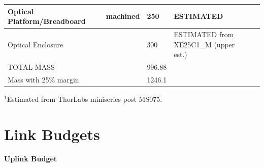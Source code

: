 \documentclass[12pt]{article}
\begin{document}
\begin{landscape}
\begin{center}
\begin{longtable}{| p{3.25cm} | p{2.2cm} | p{3cm} | p{1.75cm} | p{2.5cm} | p{1.55cm} | p{5cm} |}
    Optical Platform/Breadboard &       & machined & 250   & ESTIMATED &       &  \\ \hline
    Optical Enclosure &       &       & 300   & ESTIMATED from XE25C1\_M (upper est.) &       &  \\ \hline
    TOTAL MASS &       &       & 996.88 &       &       &  \\
    Mass with 25\% margin &       &       & 1246.1 &       &       &  \\ \hline
\end{longtable}
$^1$Estimated from ThorLabs miniseries post MS075.
\end{center}
\end{landscape}

\clearpage



\section{Link Budgets} \label{app:link_budgets}
\textbf{Uplink Budget}
\small
\end{document}
